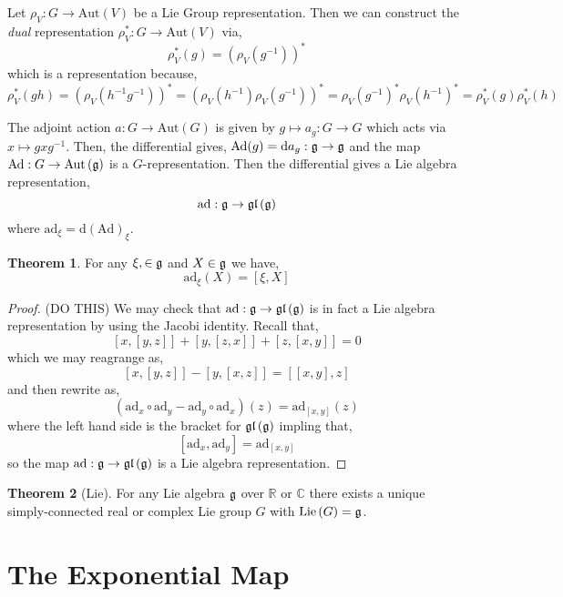 \documentclass[12pt]{extarticle}
\newcommand{\R}{\mathbb{R}}
\newcommand{\C}{\mathbb{C}}
\theoremstyle{definition}
\newtheorem{theorem}{Theorem}[section]
\newenvironment{definition}[1][Definition:]{\begin{trivlist}
\item[\hskip \labelsep {\bfseries #1}]}{\end{trivlist}}
\renewcommand{\d}[1]{\mathrm{d} #1}
\newcommand{\Aut}[1]{\mathrm{Aut}\left( #1 \right)}
\begin{document}
\begin{definition}
Let $\rho_V : G \to \Aut{V}$ be a Lie Group representation. Then we can construct the \textit{dual} representation $\rho_V^* : G \to \Aut{V}$ via,
\[ \rho_V^*(g) = (\rho_V(g^{-1}))^* \]
which is a representation because,
\[ \rho_V^*(gh) = \left( \rho_V(h^{-1} g^{-1}) \right)^* = \left( \rho_V(h^{-1}) \rho_V(g^{-1}) \right)^* = \rho_V(g^{-1})^* \rho_V(h^{-1})^* = \rho_V^*(g) \rho_V^*(h) \]
\end{definition}

\newcommand{\Ad}{\mathrm{Ad}}
\newcommand{\ad}{\mathrm{ad}}
\newcommand{\gl}[1]{\mathfrak{gl}\left( #1 \right)}

\begin{definition}
The adjoint action $a : G \to \Aut{G}$ is given by $g \mapsto a_g : G \to G$ which acts via $x \mapsto g x g^{-1}$. Then, the differential gives, $\Ad(g) = \d{a_g} : \g \to \g$ and the map $\Ad : G \to \Aut{\g}$ is a $G$-representation. Then the differential gives a Lie algebra representation,
\[ \ad : \g \to \gl{\g} \]
where $\ad_\xi = \d{(\Ad)_\xi}$. 
\end{definition}

\begin{theorem}
For any $\xi, \in \mathfrak{g}$ and $X \in \mathfrak{g}$ we have,
\[ \ad_\xi(X) = [\xi, X ] \]
\end{theorem}

\begin{proof}
(DO THIS)
We may check that $\ad : \g \to \gl{\g}$ is in fact a Lie algebra representation by using the Jacobi identity. Recall that,
\[ [x, [y, z]] + [y, [z, x]] + [z, [x, y]] = 0 \]
which we may reagrange as,
\[ [x, [y, z]] - [y, [x, z]] = [[x, y], z] \]
and then rewrite as,
\[ (\ad_x \circ \ad_y - \ad_y \circ \ad_x)(z) = \ad_{[x, y]}(z) \]
where the left hand side is the bracket for $\gl{\g}$ impling that,
\[ [ \ad_x, \ad_y ] = \ad_{[x, y]} \]
so the map $\ad : \g \to \gl{\g}$ is a Lie algebra representation.
\end{proof}

\newcommand{\Lie}[1]{\mathrm{Lie}\left( #1 \right)}


\begin{theorem}[Lie]
For any Lie algebra $\mathfrak{g}$ over $\R$ or $\C$ there exists a unique simply-connected real or complex Lie group $G$ with $\Lie{G} = \g$.
\end{theorem}

\section{The Exponential Map}
\end{document}
